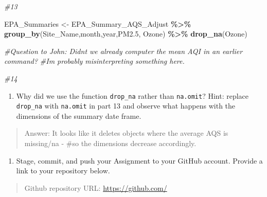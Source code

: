 \documentclass[
]{article}
\newenvironment{Shaded}{\begin{snugshade}}{\end{snugshade}}
\newcommand{\CommentTok}[1]{\textcolor[rgb]{0.56,0.35,0.01}{\textit{#1}}}
\newcommand{\FloatTok}[1]{\textcolor[rgb]{0.00,0.00,0.81}{#1}}
\newcommand{\FunctionTok}[1]{\textcolor[rgb]{0.13,0.29,0.53}{\textbf{#1}}}
\newcommand{\NormalTok}[1]{#1}
\newcommand{\OtherTok}[1]{\textcolor[rgb]{0.56,0.35,0.01}{#1}}
\newcommand{\SpecialCharTok}[1]{\textcolor[rgb]{0.81,0.36,0.00}{\textbf{#1}}}
\providecommand{\tightlist}{%
  \setlength{\itemsep}{0pt}\setlength{\parskip}{0pt}}
\begin{document}
\begin{Shaded}
\begin{Highlighting}[]
\CommentTok{\#13}

\NormalTok{EPA\_Summaries }\OtherTok{\textless{}{-}} 
\NormalTok{  EPA\_Summary\_AQS\_Adjust }\SpecialCharTok{\%\textgreater{}\%} 
  \FunctionTok{group\_by}\NormalTok{(Site\_Name,month,year,PM2}\FloatTok{.5}\NormalTok{, Ozone) }\SpecialCharTok{\%\textgreater{}\%} 
  \FunctionTok{drop\_na}\NormalTok{(Ozone)}

\CommentTok{\#Question to John: Didn\textquotesingle{}t we already computer the mean AQI in an earlier command?}
\CommentTok{\#I\textquotesingle{}m probably misinterpreting something here.}

\CommentTok{\#14}
\end{Highlighting}
\end{Shaded}

\begin{enumerate}
\def\labelenumi{\arabic{enumi}.}
\setcounter{enumi}{14}
\tightlist
\item
  Why did we use the function \texttt{drop\_na} rather than
  \texttt{na.omit}? Hint: replace \texttt{drop\_na} with
  \texttt{na.omit} in part 13 and observe what happens with the
  dimensions of the summary date frame.
\end{enumerate}

\begin{quote}
Answer: It looks like it deletes objects where the average AQS is
missing/na - \#so the dimensions decrease accordingly.
\end{quote}

\begin{enumerate}
\def\labelenumi{\arabic{enumi}.}
\setcounter{enumi}{15}
\tightlist
\item
  Stage, commit, and push your Assignment to your GitHub account.
  Provide a link to your repository below.
\end{enumerate}

\begin{quote}
Github repository URL: \url{https://github.com/}
\end{quote}
\end{document}
